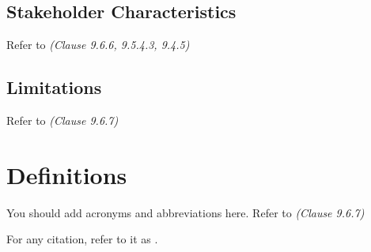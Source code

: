 \subsection{Stakeholder Characteristics}

Refer to \textit{(Clause 9.6.6, 9.5.4.3, 9.4.5)}

\subsection{Limitations}

Refer to \textit{(Clause 9.6.7)}

\section{Definitions}

You should add acronyms and abbreviations here. Refer to \textit{(Clause 9.6.7)}



For any citation, refer to it as \cite{younis2021hybrid}.
